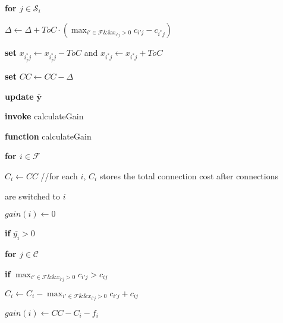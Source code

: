 \documentclass[10pt]{llncs}
\begin{document}
\begin{algorithm}[H]
\qquad{}\textbf{for $j\in\mathcal{S}_{i}$}

\qquad{}\qquad{}$\Delta\leftarrow\Delta+ToC\cdot\left(\max_{i'\in\mathcal{F}\&\&x_{i'j}>0}c_{i'j}-c_{i^{*}j}\right)$

\qquad{}\qquad{}\textbf{\textcolor{black}{set}} $x_{i_{j}^{*}j}\leftarrow x_{i_{j}^{*}j}-ToC$
and $x_{i^{*}j}\leftarrow x_{i^{*}j}+ToC$

\qquad{}\textbf{\textcolor{black}{set}} $CC\leftarrow CC-\Delta$

\qquad{}\textbf{update }$\boldsymbol{\bar{y}}$

\qquad{}\textbf{invoke} calculateGain

\medskip{}


\textbf{function} calculateGain

\qquad{}\textbf{for $i\in\mathcal{F}$}

\qquad{}\qquad{}$C_{i}\leftarrow CC$ //for each $i$, $C_{i}$
stores the total connection cost after connections 

\qquad{}\qquad{}are switched to $i$

\qquad{}\qquad{}$gain\left(i\right)\leftarrow0$

\qquad{}\qquad{}\textbf{if }$\bar{y_{i}}>0$

\qquad{}\qquad{}\qquad{}\textbf{for $j\in\mathcal{C}$}

\qquad{}\qquad{}\qquad{}\qquad{}\textbf{if }$\max_{i'\in\mathcal{F}\&\&x_{i'j}>0}c_{i'j}>c_{ij}$

\qquad{}\qquad{}\qquad{}\qquad{}\qquad{}$C_{i}\leftarrow C_{i}-\max_{i'\in\mathcal{F}\&\&x_{i'j}>0}c_{i'j}+c_{ij}$

\qquad{}\qquad{}\qquad{}$gain\left(i\right)\leftarrow CC-C_{i}-f_{i}$
\end{algorithm}
\end{document}
